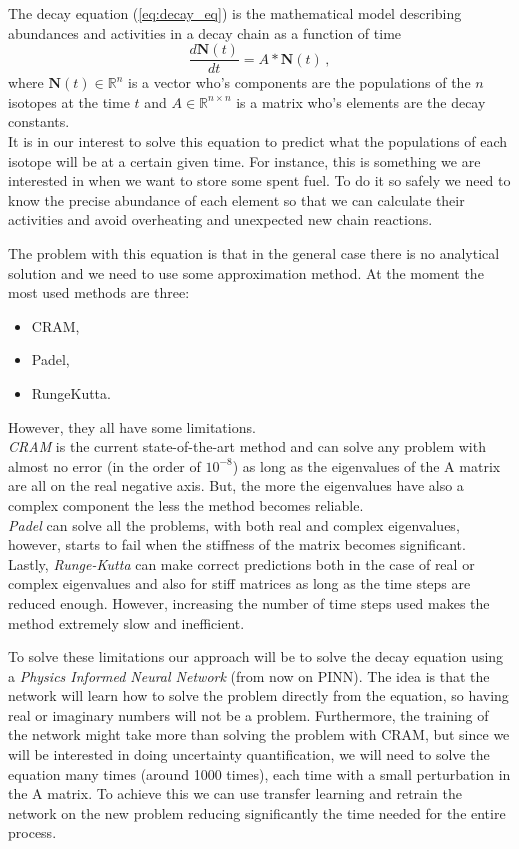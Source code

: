 The decay equation (\ref{eq:decay_eq}) is the mathematical model describing abundances and activities in a decay chain as a function of time
\begin{equation}\label{eq:decay_eq}
    \frac{d\mathbf{N}(t)}{dt} = A * \mathbf{N}(t) \,,
\end{equation}
where $\mathbf{N}(t) \in \mathbb{R}^n$ is a vector who's components are the populations of the $n$ isotopes at the time $t$ and $A \in \mathbb{R}^{n \times n}$ is a matrix who's elements are the decay constants.\\
It is in our interest to solve this equation to predict what the populations of each isotope will be at a certain given time. For instance, this is something we are interested in when we want to store some spent fuel. To do it so safely we need to know the precise abundance of each element so that we can calculate their activities and avoid overheating and unexpected new chain reactions.

The problem with this equation is that in the general case there is no analytical solution and we need to use some approximation method.
At the moment the most used methods are three:
\begin{itemize}
    \centering
    \item CRAM,
    \item Padel,
    \item RungeKutta.
\end{itemize}
However, they all have some limitations.\\
\textit{CRAM} is the current state-of-the-art method and can solve any problem with almost no error (in the order of $10^{-8}$) as long as the eigenvalues of the A matrix are all on the real negative axis. But, the more the eigenvalues have also a complex component the less the method becomes reliable.\\
\textit{Padel} can solve all the problems, with both real and complex eigenvalues, however, starts to fail when the stiffness of the matrix becomes significant.\\
Lastly, \textit{Runge-Kutta} can make correct predictions both in the case of real or complex eigenvalues and also for stiff matrices as long as the time steps are reduced enough. However, increasing the number of time steps used makes the method extremely slow and inefficient.

To solve these limitations our approach will be to solve the decay equation using a \textit{Physics Informed Neural Network} (from now on PINN). The idea is that the network will learn how to solve the problem directly from the equation, so having real or imaginary numbers will not be a problem. Furthermore, the training of the network might take more than solving the problem with CRAM, but since we will be interested in doing uncertainty quantification, we will need to solve the equation many times (around 1000 times), each time with a small perturbation in the A matrix. To achieve this we can use transfer learning and retrain the network on the new problem reducing significantly the time needed for the entire process.